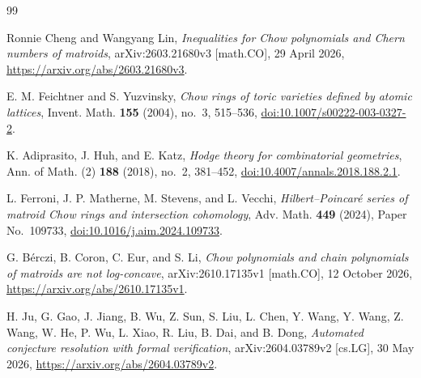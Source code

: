 \documentclass[11pt]{amsart}
\theoremstyle{definition}
\theoremstyle{remark}
\begin{document}
\begin{thebibliography}{99}

Ronnie Cheng and Wangyang Lin,
\emph{Inequalities for Chow polynomials and Chern numbers of matroids},
arXiv:2603.21680v3 [math.CO], 29 April 2026,
\url{https://arxiv.org/abs/2603.21680v3}.

E. M. Feichtner and S. Yuzvinsky,
\emph{Chow rings of toric varieties defined by atomic lattices},
Invent. Math. \textbf{155} (2004), no.~3, 515--536,
\href{https://doi.org/10.1007/s00222-003-0327-2}{doi:10.1007/s00222-003-0327-2}.

K. Adiprasito, J. Huh, and E. Katz,
\emph{Hodge theory for combinatorial geometries},
Ann. of Math. (2) \textbf{188} (2018), no.~2, 381--452,
\href{https://doi.org/10.4007/annals.2018.188.2.1}{doi:10.4007/annals.2018.188.2.1}.

L. Ferroni, J. P. Matherne, M. Stevens, and L. Vecchi,
\emph{Hilbert--Poincar\'e series of matroid Chow rings and intersection
cohomology},
Adv. Math. \textbf{449} (2024), Paper No.~109733,
\href{https://doi.org/10.1016/j.aim.2024.109733}{doi:10.1016/j.aim.2024.109733}.

G. B\'erczi, B. Coron, C. Eur, and S. Li,
\emph{Chow polynomials and chain polynomials of matroids are not
log-concave},
arXiv:2610.17135v1 [math.CO], 12 October 2026,
\url{https://arxiv.org/abs/2610.17135v1}.

H. Ju, G. Gao, J. Jiang, B. Wu, Z. Sun, S. Liu, L. Chen, Y. Wang, Y. Wang,
Z. Wang, W. He, P. Wu, L. Xiao, R. Liu, B. Dai, and B. Dong,
\emph{Automated conjecture resolution with formal verification},
arXiv:2604.03789v2 [cs.LG], 30 May 2026,
\url{https://arxiv.org/abs/2604.03789v2}.

\end{thebibliography}
\end{document}
